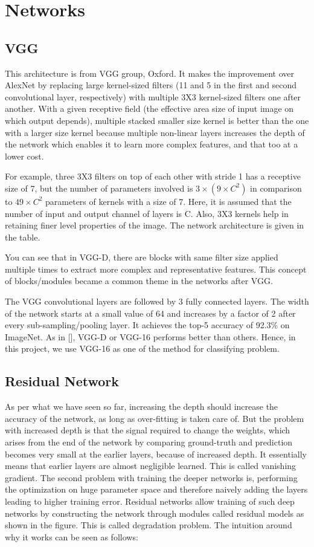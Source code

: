 \section{Networks}
\subsection{VGG}
This architecture is from VGG group, Oxford. It makes the improvement over AlexNet by replacing large kernel-sized filters (11 and 5 in the first and second convolutional layer, respectively) with multiple 3X3 kernel-sized filters one after another. With a given receptive field (the effective area size of input image on which output depends), multiple stacked smaller size kernel is better than the one with a larger size kernel because multiple non-linear layers increases the depth of the network which enables it to learn more complex features, and that too at a lower cost.


For example, three 3X3 filters on top of each other with stride 1 has a receptive size of 7, but the number of parameters involved is $3\times(9\times C^2)$ in comparison to $49\times C^2$ parameters of kernels with a size of 7. Here, it is assumed that the number of input and output channel of layers is C. Also, 3X3 kernels help in retaining finer level properties of the image. The network architecture is given in the table.

You can see that in VGG-D, there are blocks with same filter size applied multiple times to extract more complex and representative features. This concept of blocks/modules became a common theme in the networks after VGG.


The VGG convolutional layers are followed by 3 fully connected layers. The width of the network starts at a small value of 64 and increases by a factor of 2 after every sub-sampling/pooling layer. It achieves the top-5 accuracy of 92.3\% on ImageNet. As in [], VGG-D or VGG-16 performs better than others. Hence, in this project, we use VGG-16 as one of the method for classifying problem.

\subsection{Residual Network}
As per what we have seen so far, increasing the depth should increase the accuracy of the network, as long as over-fitting is taken care of. But the problem with increased depth is that the signal required to change the weights, which arises from the end of the network by comparing ground-truth and prediction becomes very small at the earlier layers, because of increased depth. It essentially means that earlier layers are almost negligible learned. This is called vanishing gradient. The second problem with training the deeper networks is, performing the optimization on huge parameter space and therefore naively adding the layers leading to higher training error. Residual networks allow training of such deep networks by constructing the network through modules called residual models as shown in the figure. This is called degradation problem. The intuition around why it works can be seen as follows:

